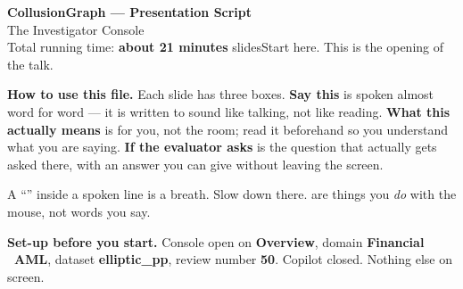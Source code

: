 \documentclass[11pt]{article}
\begin{document}
\begin{center}
{\LARGE\bfseries CollusionGraph --- Presentation Script}\\[4pt]
{\large The Investigator Console}\\[8pt]
{\small Total running time: \textbf{about 21 minutes}\quad\textbar{} slides\quad\textbar\quad Start here. This is the opening of the talk.}
\end{center}

\vspace{6pt}
\begin{tcolorbox}[colback=metagrey!6,colframe=metagrey!45,boxrule=0.6pt,arc=1pt]
\textbf{How to use this file.} Each slide has three boxes.
\textbf{Say this} is spoken almost word for word --- it is written to sound
like talking, not like reading. \textbf{What this actually means} is for you,
not the room; read it beforehand so you understand what you are saying.
\textbf{If the evaluator asks} is the question that actually gets asked there,
with an answer you can give without leaving the screen.

A ``\bt'' inside a spoken line is a breath. Slow down there.
 are things you \emph{do} with the mouse, not words you say.

\textbf{Set-up before you start.} Console open on \textbf{Overview}, domain
\textbf{Financial \textbullet\ AML}, dataset \textbf{elliptic\_pp}, review
number \textbf{50}. Copilot closed. Nothing else on screen.
\end{tcolorbox}


\end{document}
